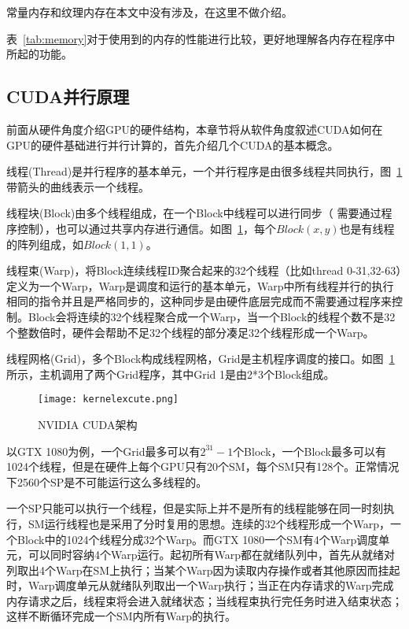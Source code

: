 常量内存和纹理内存在本文中没有涉及，在这里不做介绍。

表~\ref{tab:memory}对于使用到的内存的性能进行比较，更好地理解各内存在程序中所起的功能。

\subsection{CUDA并行原理}

前面从硬件角度介绍GPU的硬件结构，本章节将从软件角度叙述CUDA如何在GPU的硬件基础进行并行计算的，首先介绍几个CUDA的基本概念。

线程(Thread)是并行程序的基本单元，一个并行程序是由很多线程共同执行，图~\ref{fig:nvidia-cuda-arch}带箭头的曲线表示一个线程。

线程块(Block)由多个线程组成，在一个Block中线程可以进行同步（ 需要通过程序控制），也可以通过共享内存进行通信。如图~\ref{fig:nvidia-cuda-arch}，每个$Block(x,y)$也是有线程的阵列组成，如$Block(1,1)$。

线程束(Warp)，将Block连续线程ID聚合起来的32个线程（比如thread 0-31,32-63）定义为一个Warp，Warp是调度和运行的基本单元，Warp中所有线程并行的执行相同的指令并且是严格同步的，这种同步是由硬件底层完成而不需要通过程序来控制。Block会将连续的32个线程聚合成一个Warp，当一个Block的线程个数不是32个整数倍时，硬件会帮助不足32个线程的部分凑足32个线程形成一个Warp。

线程网格(Grid)，多个Block构成线程网格，Grid是主机程序调度的接口。如图~\ref{fig:nvidia-cuda-arch}所示，主机调用了两个Grid程序，其中Grid 1是由2*3个Block组成。

\begin{figure}[H] %
	\centering
	\texttt{[image: kernelexcute.png]}
	\caption{NVIDIA CUDA架构}
	\label{fig:nvidia-cuda-arch}
\end{figure}

以GTX 1080为例，一个Grid最多可以有$2^{31}-1$个Block，一个Block最多可以有1024个线程，但是在硬件上每个GPU只有20个SM，每个SM只有128个。正常情况下2560个SP是不可能运行这么多线程的。

一个SP只能可以执行一个线程，但是实际上并不是所有的线程能够在同一时刻执行，SM运行线程也是采用了分时复用的思想。连续的32个线程形成一个Warp，一个Block中的1024个线程分成32个Warp。而GTX 1080一个SM有4个Warp调度单元，可以同时容纳4个Warp运行。起初所有Warp都在就绪队列中，首先从就绪对列取出4个Warp在SM上执行；当某个Warp因为读取内存操作或者其他原因而挂起时，Warp调度单元从就绪队列取出一个Warp执行；当正在内存请求的Warp完成内存请求之后，线程束将会进入就绪状态；当线程束执行完任务时进入结束状态；这样不断循环完成一个SM内所有Warp的执行。

